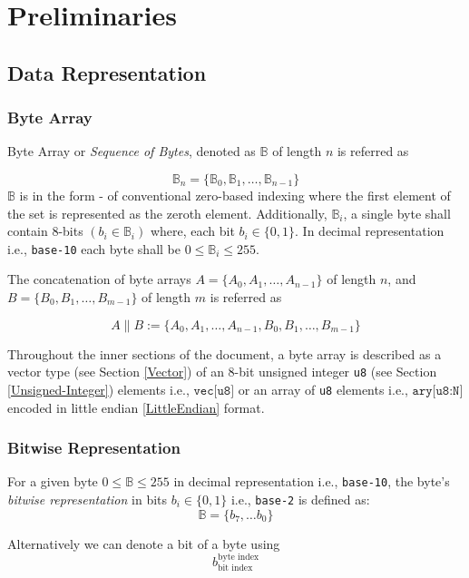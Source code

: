\documentclass[../alan-handbook.tex]{subfiles}
\begin{document}
\section{Preliminaries} \label{Preliminaries}

\subsection{Data Representation}  \label{DataRepresentation}

\subsubsection{Byte Array} \label{ByteArray}

Byte Array or \textit{Sequence of Bytes}, denoted as $\mathbb{B}$ of length $n$ is referred as

$$\mathbb{B}_n=\{\mathbb{B}_0,\mathbb{B}_1,\ldots,\mathbb{B}_{n-1}\}$$
$\mathbb{B}$ is in the form - of conventional zero-based indexing where the first element of the set is represented as the zeroth element. Additionally, $\mathbb{B}_i$, a single byte shall contain 8-bits $(b_i \in \mathbb{B}_i)$ where, each bit $b_i \in \{0,1\}$. In decimal representation i.e., \texttt{base-10} each byte shall be $0 \leq \mathbb{B}_i \leq 255$.

The concatenation of byte arrays $A=\{A_0,A_1,\ldots,A_{n-1}\}$ of length $n$, and $B=\{B_0,B_1,\ldots,B_{m-1}\}$ of length $m$ is referred as

$$A \parallel B := \{A_0,A_1,\ldots,A_{n-1},B_0,B_1,\ldots,B_{m-1}\}$$

Throughout the inner sections of the document, a byte array is described as a vector type (see Section \ref{Vector}) of an 8-bit unsigned integer \texttt{u8} (see Section \ref{Unsigned-Integer}) elements i.e., $\texttt{vec[u8]}$ or an array of \texttt{u8} elements i.e., $\texttt{ary[u8:N]}$ encoded in little endian \ref{LittleEndian} format. 

\subsubsection{Bitwise Representation} \label{BitwiseRepresentation}

For a given byte $0\leq \mathbb{B} \leq 255$ in decimal representation i.e., \texttt{base-10}, the byte's \textit{bitwise representation} in bits $b_i \in \{0,1\}$ i.e., \texttt{base-2} is defined as:
$$\mathbb{B} = \{b_7,\ldots b_0\}$$

Alternatively we can denote a bit of a byte using $$b^{\text{byte index}}_{\text{bit index}}$$
\end{document}
